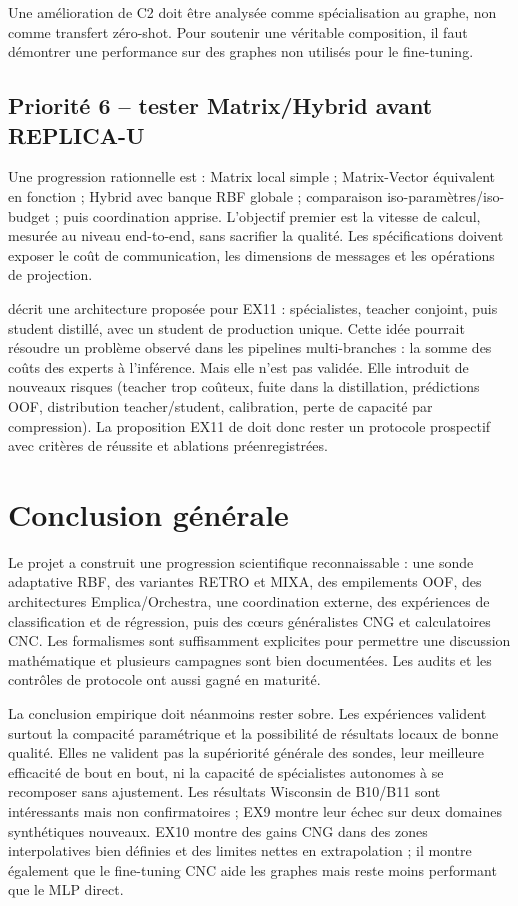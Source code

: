 \documentclass[11pt,a4paper]{article}
\newcommand{\code}[1]{\texttt{\detokenize{#1}}}
\newcommand{\fichier}[1]{\path{#1}}
\begin{document}
Une amélioration de C2 doit être analysée comme spécialisation au graphe, non comme transfert zéro-shot. Pour soutenir une véritable composition, il faut démontrer une performance sur des graphes non utilisés pour le fine-tuning.

\subsection{Priorité 6 -- tester Matrix/Hybrid avant REPLICA-U}

Une progression rationnelle est : Matrix local simple ; Matrix-Vector équivalent en fonction ; Hybrid avec banque RBF globale ; comparaison iso-paramètres/iso-budget ; puis coordination apprise. L'objectif premier est la vitesse de calcul, mesurée au niveau end-to-end, sans sacrifier la qualité. Les spécifications doivent exposer le coût de communication, les dimensions de messages et les opérations de projection.

\code{Replica_U_0.tex} décrit une architecture proposée pour EX11 : spécialistes, teacher conjoint, puis student distillé, avec un student de production unique. Cette idée pourrait résoudre un problème observé dans les pipelines multi-branches : la somme des coûts des experts à l'inférence. Mais elle n'est pas validée. Elle introduit de nouveaux risques (teacher trop coûteux, fuite dans la distillation, prédictions OOF, distribution teacher/student, calibration, perte de capacité par compression). La proposition EX11 de \fichier{th_sondes_core_test_1.tex} doit donc rester un protocole prospectif avec critères de réussite et ablations préenregistrées.

\section{Conclusion générale}

Le projet a construit une progression scientifique reconnaissable : une sonde adaptative RBF, des variantes RETRO et MIXA, des empilements OOF, des architectures Emplica/Orchestra, une coordination externe, des expériences de classification et de régression, puis des cœurs généralistes CNG et calculatoires CNC. Les formalismes sont suffisamment explicites pour permettre une discussion mathématique et plusieurs campagnes sont bien documentées. Les audits et les contrôles de protocole ont aussi gagné en maturité.

La conclusion empirique doit néanmoins rester sobre. Les expériences valident surtout la compacité paramétrique et la possibilité de résultats locaux de bonne qualité. Elles ne valident pas la supériorité générale des sondes, leur meilleure efficacité de bout en bout, ni la capacité de spécialistes autonomes à se recomposer sans ajustement. Les résultats Wisconsin de B10/B11 sont intéressants mais non confirmatoires ; EX9 montre leur échec sur deux domaines synthétiques nouveaux. EX10 montre des gains CNG dans des zones interpolatives bien définies et des limites nettes en extrapolation ; il montre également que le fine-tuning CNC aide les graphes mais reste moins performant que le MLP direct.
\end{document}
